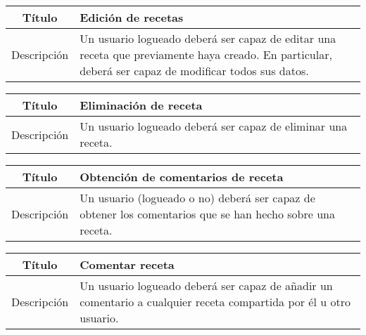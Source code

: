 \begin{center}
  
  \begin{tabularx}{\textwidth}{|c|X|}
    \hline
    Título & Edición de recetas \\

    \hline

    Descripción & Un usuario logueado deberá ser capaz de editar una receta que
    previamente haya creado. En particular, deberá ser capaz de modificar
    todos sus datos.\\

    \hline
  \end{tabularx}
\end{center}


\begin{center}
  
  \begin{tabularx}{\textwidth}{|c|X|}
    \hline
    Título & Eliminación de receta \\

    \hline

    Descripción & Un usuario logueado deberá ser capaz de eliminar una receta. \\

    \hline
  \end{tabularx}
\end{center}


\begin{center}
  
  \begin{tabularx}{\textwidth}{|c|X|}
    \hline
    Título & Obtención de comentarios de receta \\

    \hline

    Descripción & Un usuario (logueado o no) deberá ser capaz de obtener los
    comentarios que se han hecho sobre una receta.\\

    \hline
  \end{tabularx}
\end{center}


\begin{center}
  
  \begin{tabularx}{\textwidth}{|c|X|}
    \hline
    Título & Comentar receta \\

    \hline

    Descripción & Un usuario logueado deberá ser capaz de añadir un comentario
    a cualquier receta compartida por él u otro usuario. \\

    \hline
  \end{tabularx}
\end{center}


